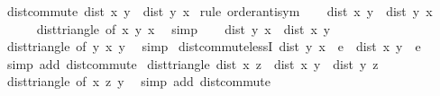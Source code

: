 \begin{isabellebody}
%
\isadelimproof
\isanewline
%
\endisadelimproof
\isanewline
{}\isamarkupfalse%
\ dist{\isacharunderscore}{\kern0pt}commute{\isacharcolon}{\kern0pt}\ {\isachardoublequoteopen}dist\ x\ y\ {\isacharequal}{\kern0pt}\ dist\ y\ x{\isachardoublequoteclose}\isanewline
%
\isadelimproof
%
\endisadelimproof
%
\isatagproof
{}\isamarkupfalse%
\ {\isacharparenleft}{\kern0pt}rule\ order{\isacharunderscore}{\kern0pt}antisym{\isacharparenright}{\kern0pt}\isanewline
\ \ \isamarkupfalse%
\ {\isachardoublequoteopen}dist\ x\ y\ {\isasymle}\ dist\ y\ x{\isachardoublequoteclose}\isanewline
\ \ \ \ \isamarkupfalse%
\ dist{\isacharunderscore}{\kern0pt}triangle{}\ {\isacharbrackleft}{\kern0pt}of\ x\ y\ x{\isacharbrackright}{\kern0pt}\ \isamarkupfalse%
\ simp\isanewline
\ \ \isamarkupfalse%
\ {\isachardoublequoteopen}dist\ y\ x\ {\isasymle}\ dist\ x\ y{\isachardoublequoteclose}\isanewline
\ \ \ \ \isamarkupfalse%
\ dist{\isacharunderscore}{\kern0pt}triangle{}\ {\isacharbrackleft}{\kern0pt}of\ y\ x\ y{\isacharbrackright}{\kern0pt}\ \isamarkupfalse%
\ simp\isanewline
{}\isamarkupfalse%
%
\endisatagproof
{\isafoldproof}%
%
\isadelimproof
\isanewline
%
\endisadelimproof
\isanewline
{}\isamarkupfalse%
\ dist{\isacharunderscore}{\kern0pt}commute{\isacharunderscore}{\kern0pt}lessI{\isacharcolon}{\kern0pt}\ {\isachardoublequoteopen}dist\ y\ x\ {\isacharless}{\kern0pt}\ e\ {\isasymLongrightarrow}\ dist\ x\ y\ {\isacharless}{\kern0pt}\ e{\isachardoublequoteclose}\isanewline
%
\isadelimproof
\ \ %
\endisadelimproof
%
\isatagproof
{}\isamarkupfalse%
\ {\isacharparenleft}{\kern0pt}simp\ add{\isacharcolon}{\kern0pt}\ dist{\isacharunderscore}{\kern0pt}commute{\isacharparenright}{\kern0pt}%
\endisatagproof
{\isafoldproof}%
%
\isadelimproof
\isanewline
%
\endisadelimproof
\isanewline
{}\isamarkupfalse%
\ dist{\isacharunderscore}{\kern0pt}triangle{\isacharcolon}{\kern0pt}\ {\isachardoublequoteopen}dist\ x\ z\ {\isasymle}\ dist\ x\ y\ {\isacharplus}{\kern0pt}\ dist\ y\ z{\isachardoublequoteclose}\isanewline
%
\isadelimproof
\ \ %
\endisadelimproof
%
\isatagproof
{}\isamarkupfalse%
\ dist{\isacharunderscore}{\kern0pt}triangle{}\ {\isacharbrackleft}{\kern0pt}of\ x\ z\ y{\isacharbrackright}{\kern0pt}\ \isamarkupfalse%
\ {\isacharparenleft}{\kern0pt}simp\ add{\isacharcolon}{\kern0pt}\ dist{\isacharunderscore}{\kern0pt}commute{\isacharparenright}{\kern0pt}%

\end{isabellebody}
